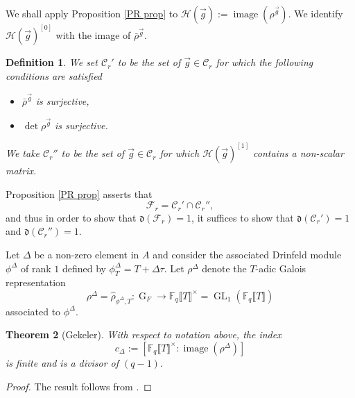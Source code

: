 \documentclass[11pt]{amsart}
\newtheorem{theorem}{Theorem}[section]
\newtheorem{definition}[theorem]{Definition}
\newcommand{\cF}{\mathcal{F}}
\newcommand{\cH}{\mathcal{H}}
\newcommand{\F}{\mathbb{F}}
\newcommand{\cC}{\mathcal{C}}
\newcommand{\op}[1]{\operatorname{#1}}
\numberwithin{equation}{section}
\begin{document}
We shall apply Proposition \ref{PR prop} to $\cH(\vec{g}):=\op{image}\left(\rho^{\vec{g}}\right)$. We identify $\mathcal{H}(\vec{g})^{[0]}$ with the image of $\bar{\rho}^{\vec{g}}$.
\begin{definition}
    We set $\cC_r'$ to be the set of $\vec{g}\in \cC_r$ for which the following conditions are satisfied
\begin{itemize}
   \item $\bar{\rho}^{\vec{g}}$ is surjective, 
          \item $\op{det}\rho^{\vec{g}}$ is surjective.
\end{itemize}
We take $\cC_r''$ to be the set of $\vec{g}\in \cC_r$ for which $\mathcal{H}(\vec{g})^{[1]}$ contains a non-scalar matrix.
\end{definition}

Proposition \ref{PR prop} asserts that 
\begin{equation}\label{set intersection property}
    \cF_r=\cC_r' \cap \cC_r'',
\end{equation}
and thus in order to show that $\mathfrak{d}(\cF_r)=1$, it suffices to show that $\mathfrak{d}(\cC_r')=1$ and $\mathfrak{d}(\cC_r'')=1$.

\par Let $\Delta$ be a non-zero element in $A$ and consider the associated Drinfeld module $\phi^\Delta$ of rank $1$ defined by $\phi_T^\Delta=T+\Delta \tau$. Let $\rho^\Delta$ denote the $T$-adic Galois representation \[\rho^\Delta=\hat{\rho}_{\phi^\Delta, T}:\op{G}_F\rightarrow \F_q\llbracket T\rrbracket^\times=\op{GL}_1\left(\F_q\llbracket T\rrbracket\right)\]
associated to $\phi^\Delta$. 
\begin{theorem}[Gekeler]\label{gekeler index thm}
    With respect to notation above, the index \[c_{\Delta}:=\left[\F_q\llbracket T\rrbracket^\times: \op{image}(\rho^\Delta)\right]\] is finite and is a divisor of $(q-1)$. 
\end{theorem}
\begin{proof}
    The result follows from \cite[Corollary 1.2]{Gekelertwistedcarlitz}.
\end{proof}
\end{document}
